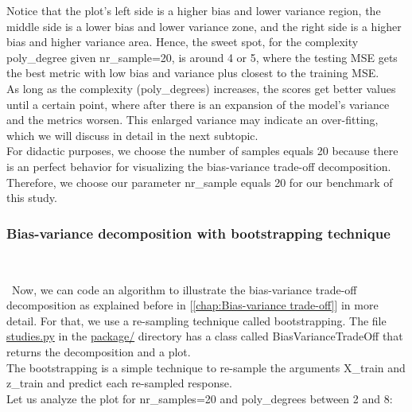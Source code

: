 Notice that the plot's left side is a higher bias and lower variance region, the middle side is a lower bias and lower variance zone, and the right side is a higher bias and higher variance area. Hence, the sweet spot, for the complexity poly\_degree given nr\_sample=20, is around 4 or 5, where the testing MSE gets the best metric with low bias and variance plus closest to the training MSE.\\

As long as the complexity (poly\_degrees) increases, the scores get better values until a certain point, where after there is an expansion of the model's variance and the metrics worsen. This enlarged variance may indicate an over-fitting, which we will discuss in detail in the next subtopic.\\

For didactic purposes, we choose the number of samples equals 20 because there is an perfect behavior for visualizing the bias-variance trade-off decomposition.\\

Therefore, we choose our parameter nr\_sample equals 20 for our benchmark of this study.\\

\subsubsection{Bias-variance decomposition with bootstrapping technique} \\
\label{chap:Bias-variance decomposition with bootstrapping technique}

\quad \, Now, we can code an algorithm to illustrate the bias-variance trade-off decomposition as explained before in [\ref{chap:Bias-variance trade-off}] in more detail. For that, we use a re-sampling technique called bootstrapping. The file \href{https://github.com/fabiorodp/UiO-FYS-STK4155/blob/master/Project1/package/studies.py}{studies.py} in the \href{https://github.com/fabiorodp/UiO-FYS-STK4155/tree/master/Project1/package}{package/} directory has a class called BiasVarianceTradeOff that returns the decomposition and a plot. \\

The bootstrapping is a simple technique to re-sample the arguments X\_train and z\_train and predict each re-sampled response. \\

Let us analyze the plot for nr\_samples=20 and poly\_degrees between 2 and 8:

